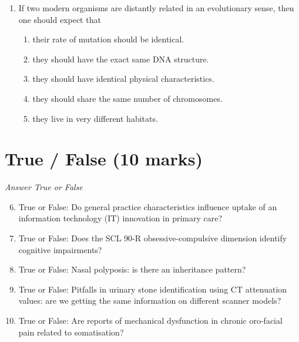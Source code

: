 \documentclass[12pt]{article}
\begin{document}
\begin{enumerate}[label=\arabic*.]
\begin{enumerate}[label=(\alph*)]
    \item Protects the cell from foreign invaders
    \item Acts as a storage for genetic material
    \item Regulates the pH level within the cell
    \item Transports oxygen throughout the cell
    \item Removes nitrogenous wastes
\end{enumerate}
\item If two modern organisms are distantly related in an evolutionary sense, then one should expect that
\begin{enumerate}[label=(\alph*)]
    \item their rate of mutation should be identical.
    \item they should have the exact same DNA structure.
    \item they should have identical physical characteristics.
    \item they should share the same number of chromosomes.
    \item they live in very different habitats.
\end{enumerate}
\end{enumerate}

\section*{True / False (10 marks)}
\textit{Answer True or False}
\begin{enumerate}[label=\arabic*.]
\setcounter{enumi}{5}
\item True or False: Do general practice characteristics influence uptake of an information technology (IT) innovation in primary care?
\item True or False: Does the SCL 90-R obsessive-compulsive dimension identify cognitive impairments?
\item True or False: Nasal polyposis: is there an inheritance pattern?
\item True or False: Pitfalls in urinary stone identification using CT attenuation values: are we getting the same information on different scanner models?
\item True or False: Are reports of mechanical dysfunction in chronic oro-facial pain related to somatisation?
\end{enumerate}
\end{document}
